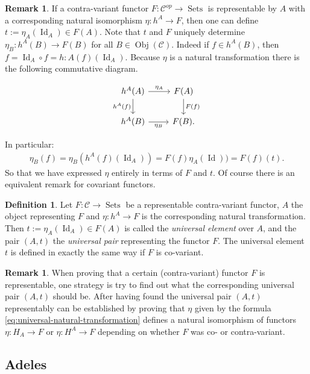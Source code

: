 \documentclass[a4paper,12pt,reqno]{amsart}
\DeclareMathOperator{\Sets}{Sets}
\DeclareMathOperator{\id}{Id}
\DeclareMathOperator{\Obj}{Obj}
\theoremstyle{definition}
\newtheorem{definition}[lemma]{Definition}
\newtheorem{remark}[lemma]{Remark}
\numberwithin{lemma}{section}
\numberwithin{equation}{section}
\numberwithin{figure}{section}
\begin{document}
\begin{remark}\label{rem:universal-element-defines-natural-transformation}
If a contra-variant functor $F: \mathcal C ^{op} \to \Sets$ is representable by $A$ with a corresponding natural isomorphism $\eta: h^A \to F$, then one can define  $t := \eta_A(\id_A) \in F(A)$. Note that $t$ and $F$ uniquely determine $\eta_B: h^A(B) \to F(B)$ for all $B \in \Obj(\mathcal C)$. Indeed if $f \in h^A(B)$, then $f = \id_A \circ f= h:A(f) (\id_A)$. Because $\eta$ is a natural transformation there is the following commutative diagram.


\[
\begin{tikzcd}
h^A(A) \arrow[d, "h^A(f)"'] \arrow[r, "\eta_A"] & F(A) \arrow[d, "F(f)"] \\
h^A(B) \arrow[r, "\eta_B"'] & F(B).
\end{tikzcd}
\]

In particular: \begin{align}\eta_B(f) =  \eta_B(h^A(f) (\id_A))=F(f)\eta_A(\id))=F(f)(t).\label{eq:universal-natural-transformation}\end{align}
So that we have expressed $\eta$ entirely in terms of $F$ and $t$. Of course there is an equivalent remark for covariant functors.
\end{remark}

\begin{definition}\label{def:universal-pair}
	Let $F: \mathcal C \to \Sets$ be a representable contra-variant functor, $A$ the object representing $F$ and $\eta: h^A \to F$ is the corresponding natural transformation. Then $t := \eta_A(\id_A) \in F(A)$  is called the \textit{universal element} over $A$, and the pair $(A,t)$ the \textit{universal pair} representing the functor $F$. The universal element $t$ is defined in exactly the same way if $F$ is co-variant.
\end{definition}

\begin{remark}
When proving that a certain (contra-variant) functor $F$ is representable, one strategy is try to find out what the corresponding universal pair $(A,t)$ should be. After having found the universal pair $(A,t)$ representably can be established by proving that $\eta$ given by the formula \cref{eq:universal-natural-transformation} defines a natural isomorphism of functors $\eta: H_A \to F$ or $\eta: H^A \to F$ depending on whether $F$ was co- or contra-variant.
\end{remark}

\subsection{Adeles}
\end{document}
